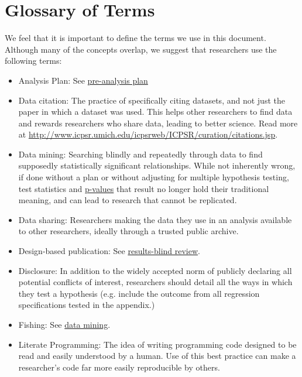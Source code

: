 \documentclass[12pt] {article}
\begin{document}
\section{Glossary of Terms}
We feel that it is important to define the terms we use in this document. Although many of the concepts overlap, we suggest that researchers use the following terms:
\begin{itemize}
\item
Analysis Plan: See \hyperref[def-pap]{pre-analysis plan}

\item
Data citation: The practice of specifically citing datasets, and not just the paper in which a dataset was used.  This helps other researchers to find data and rewards researchers who share data, leading to better science. Read more at \url{http://www.icpsr.umich.edu/icpsrweb/ICPSR/curation/citations.jsp}. 

\item \label{def-mining}
Data mining: Searching blindly and repeatedly through data to find supposedly statistically significant relationships. While not inherently wrong, if done without a plan or without adjusting for multiple hypothesis testing, test statistics and \hyperref[def-pvalue]{p-values} that result no longer hold their traditional meaning, and can lead to research that cannot be replicated.

\item \label{def-datasharing}
Data sharing: Researchers making the data they use in an analysis available to other researchers, ideally through a trusted public archive. 

\item\label{def-dbp}
Design-based publication: See \hyperref[def-rbr]{results-blind review}.

\item
Disclosure: In addition to the widely accepted norm of publicly declaring all potential conflicts of interest, researchers should detail all the ways in which they test a hypothesis (e.g. include the outcome from all regression specifications tested in the appendix.)

\item
Fishing: See \hyperref[def-mining]{data mining}.

\item
Literate Programming: The idea of writing programming code designed to be read and easily understood by a human. Use of this best practice can make a researcher’s code far more easily reproducible by others.


\end{itemize}
\end{document}
